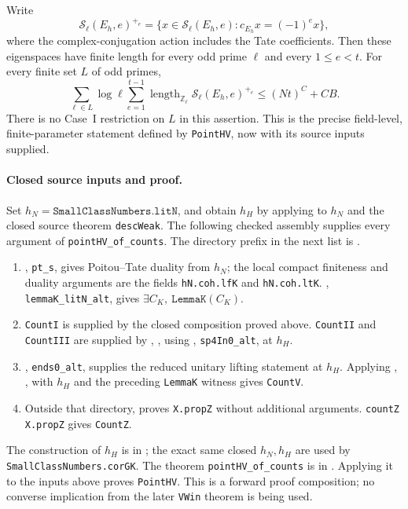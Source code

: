 Write
\[
 \mathcal S_\ell(E_h,e)^{+_e}
 =\{x\in\mathcal S_\ell(E_h,e):c_{E_h}x=(-1)^e x\},
\]
where the complex-conjugation action includes the Tate coefficients.
Then these eigenspaces have finite length for every odd prime \(\ell\)
and every \(1\le e<t\).  For every finite set \(L\) of odd primes,
\begin{equation}\label{eq:host-point-bound}
 \sum_{\ell\in L}\log\ell\sum_{e=1}^{t-1}
 \operatorname{length}_{\mathbb Z_\ell}
       \mathcal S_\ell(E_h,e)^{+_e}
 \le (Nt)^C+CB.
\end{equation}
There is no Case~I restriction on \(L\) in this assertion.  This is
the precise field-level, finite-parameter statement defined by
\texttt{PointHV}, now with its source inputs supplied.

\paragraph{Closed source inputs and proof.}
Set \(h_N=\texttt{SmallClassNumbers.litN}\), and obtain
\(h_H\) by applying
 to \(h_N\) and the
closed source theorem \texttt{descWeak}.  The following checked
assembly supplies every argument of \texttt{pointHV\_of\_counts}.
The directory prefix in the next list is
.
\begin{enumerate}
 \item {}, \texttt{pt\_s}, gives Poitou--Tate
 duality from \(h_N\); the local compact finiteness and duality
 arguments are the fields \texttt{hN.coh.lfK} and
 \texttt{hN.coh.ltK}.
 , \texttt{lemmaK\_litN\_alt}, gives
 \(\exists C_K,\ \texttt{LemmaK}(C_K)\).
 \item \texttt{CountI} is supplied by the closed composition proved
 above.  \texttt{CountII} and \texttt{CountIII} are supplied by
 ,
 , using
 , \texttt{sp4In0\_alt}, at \(h_H\).
 \item {}, \texttt{ends0\_alt}, supplies the
 reduced unitary lifting statement at \(h_H\).  Applying
 ,
 , with
 \(h_H\) and the preceding \texttt{LemmaK} witness gives
 \texttt{CountV}.
 \item Outside that directory, 
 proves \texttt{X.propZ} without additional arguments.
 \texttt{countZ X.propZ} gives \texttt{CountZ}.
\end{enumerate}
The construction of \(h_H\) is in
; the exact same closed
\(h_N,h_H\) are used by \texttt{SmallClassNumbers.corGK}.
The theorem \texttt{pointHV\_of\_counts} is in
.  Applying it to the
inputs above proves \texttt{PointHV}.  This is a forward proof
composition; no converse implication from the later \texttt{VWin}
theorem is being used.

